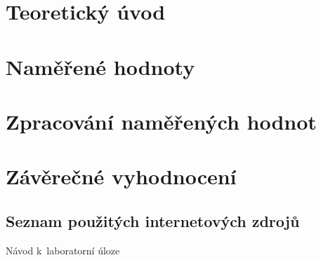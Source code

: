\documentclass[a4paper,12pt]{article}   %
\begin{document}
\section{Teoretický úvod}
\label{chap:teoreticky_uvod}



\section{Naměřené hodnoty}
\label{chap:namerene_hodnoty}



\section{Zpracování naměřených hodnot}
\label{chap:zpracovani_hodnot}



\section{Závěrečné vyhodnocení}
\label{chap:zaver}



\clearpage
\renewcommand{\refname}{Seznam použité literatury a~zdrojů informací} 

\begin{thebibliography}{99}

\subsection*{Seznam použitých internetových zdrojů}
     Návod k~laboratorní úloze
    
\end{thebibliography}
\end{document}
